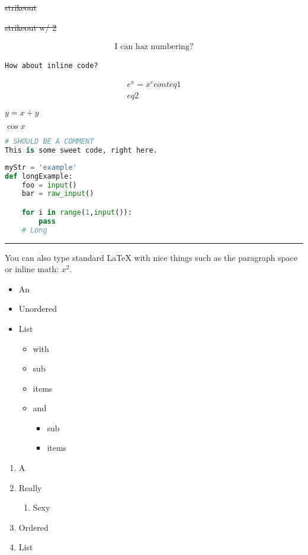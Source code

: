 \documentclass{article}
\begin{document}
\sout{strikeout}

\sout{strikeout w/ 2}

\begin{gather}
\textrm{I can haz numbering?}
\end{gather}

\lstinline[columns=fixed]$How about inline code?$

\begin{gather*}
e^x = x^e cont eq 1\\
eq 2
\end{gather*}

$ y = x + y $

$ \cos x $

\begin{lstlisting}[language=python,]
# SHOULD BE A COMMENT
This is some sweet code, right here.
\end{lstlisting}

\begin{lstlisting}[language=python,caption=This is code with a caption.]
myStr = 'example'
def longExample:
    foo = input()
    bar = raw_input()

    for i in range(1,input()):
        pass
    # Long
\end{lstlisting}

\rule{\textwidth}{0.4pt}

You can also type standard \LaTeX{} with nice things
such as the paragraph space or $\textrm{inline math: }x^2$.

\begin{itemize}
\item An
\item Unordered
\item List
\begin{itemize}
\item with
\item sub
\item items
\item and
\begin{itemize}
\item sub
\item items
\end{itemize}
\end{itemize}
\end{itemize}
\begin{enumerate}
\item A
\item Really
\begin{enumerate}
\item Sexy
\end{enumerate}
\item Ordered
\item List
\end{enumerate}
\end{document}

